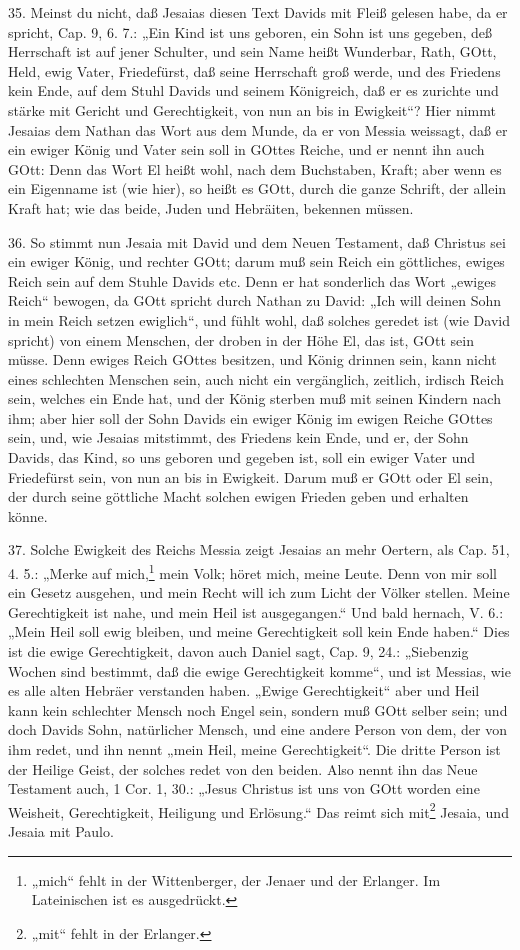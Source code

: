 35. Meinst du nicht, daß Jesaias diesen Text Davids mit Fleiß gelesen habe, da er spricht, Cap. 9, 6. 7.: „Ein Kind ist uns geboren, ein Sohn ist uns gegeben, deß Herrschaft ist auf
jener Schulter, und sein Name heißt Wunderbar, Rath, GOtt, Held, ewig Vater, Friedefürst, daß seine Herrschaft groß werde, und des Friedens kein Ende, auf dem Stuhl Davids und seinem Königreich, daß er es zurichte und stärke mit Gericht und Gerechtigkeit, von nun an bis in Ewigkeit“? Hier nimmt Jesaias dem Nathan das Wort aus dem Munde, da er von Messia weissagt, daß er ein ewiger König und Vater sein soll in GOttes Reiche, und er nennt ihn auch GOtt: Denn das Wort El heißt wohl, nach dem Buchstaben, Kraft; aber wenn es ein Eigenname ist (wie hier), so heißt es GOtt, durch die ganze Schrift, der allein Kraft hat; wie das beide, Juden und Hebräiten, bekennen müssen.

36. So stimmt nun Jesaia mit David und dem Neuen Testament, daß Christus sei ein ewiger König, und rechter GOtt; darum muß sein Reich ein göttliches, ewiges Reich sein auf dem Stuhle Davids etc. Denn er hat sonderlich das Wort „ewiges Reich“ bewogen, da GOtt spricht durch Nathan zu David: „Ich will deinen Sohn in mein Reich setzen ewiglich“, und fühlt wohl, daß solches geredet ist (wie David spricht) von einem Menschen, der droben in der Höhe El, das ist, GOtt sein müsse. Denn ewiges Reich GOttes besitzen, und König drinnen sein, kann nicht eines schlechten Menschen sein, auch nicht ein vergänglich, zeitlich, irdisch Reich sein, welches ein Ende hat, und der König sterben muß mit seinen Kindern nach ihm; aber hier soll der Sohn Davids ein ewiger König im ewigen Reiche GOttes sein, und, wie Jesaias mitstimmt, des Friedens kein Ende, und er, der Sohn Davids, das Kind, so uns geboren und gegeben ist, soll ein ewiger Vater und Friedefürst sein, von nun an bis in Ewigkeit. Darum muß er GOtt oder El sein, der durch seine göttliche Macht solchen ewigen Frieden geben und erhalten könne.

37. Solche Ewigkeit des Reichs Messia zeigt Jesaias an mehr Oertern, als Cap. 51, 4. 5.: „Merke auf mich,\footnote{„mich“ fehlt in der Wittenberger, der Jenaer und der Erlanger. Im Lateinischen ist es ausgedrückt.} mein Volk; höret mich, meine Leute. Denn von mir soll ein Gesetz ausgehen, und mein Recht will ich zum Licht der Völker stellen. Meine Gerechtigkeit ist nahe, und mein Heil ist ausgegangen.“ Und bald hernach, V. 6.: „Mein Heil soll ewig bleiben, und meine Gerechtigkeit soll kein Ende haben.“ Dies ist die ewige Gerechtigkeit, davon auch Daniel sagt, Cap. 9, 24.: „Siebenzig Wochen sind bestimmt, daß die ewige Gerechtigkeit komme“, und ist Messias, wie es alle alten Hebräer verstanden haben. „Ewige Gerechtigkeit“ aber und Heil kann kein schlechter Mensch noch Engel sein, sondern muß GOtt selber sein; und doch Davids Sohn, natürlicher Mensch, und eine andere Person von dem, der von ihm redet, und ihn nennt „mein Heil, meine Gerechtigkeit“. Die dritte Person ist der Heilige Geist, der solches redet von den beiden. Also nennt ihn das Neue Testament auch, 1 Cor. 1, 30.: „Jesus Christus ist uns von GOtt worden eine Weisheit, Gerechtigkeit, Heiligung und Erlösung.“ Das reimt sich mit\footnote{„mit“ fehlt in der Erlanger.} Jesaia, und Jesaia mit Paulo.

